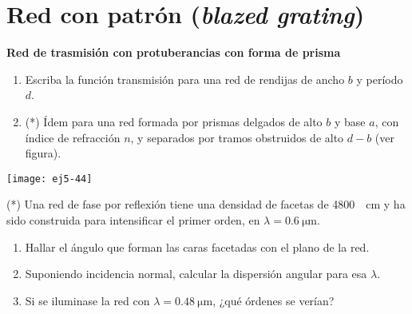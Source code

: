 \section*{Red con patrón (\emph{blazed grating})}

\item 
\begin{minipage}[t][2.5cm]{0.85\textwidth}
\textbf{Red de trasmisión con protuberancias con forma de prisma}
\begin{enumerate}
	\item Escriba la función transmisión para una red de rendijas de ancho $b$ y período $d$.
	\item (*) Ídem para una red formada por prismas delgados de alto $b$ y base $a$, con índice de refracción $n$, y separados por tramos obstruidos de alto $d-b$ (ver figura). 
\end{enumerate}
\end{minipage}
\begin{minipage}[c][1cm][t]{0.1\textwidth}
	\texttt{[image: ej5-44]}
\end{minipage}


\item (*) Una red de fase por reflexión tiene una densidad de facetas de \SI{4800}{\per\centi\metre} y ha sido construida para intensificar el primer orden, en $\lambda = \SI{0.6}{\micro\metre}$.
\begin{enumerate}
	\item Hallar el ángulo que forman las caras facetadas con el plano de la red. 
	\item Suponiendo incidencia normal, calcular la dispersión angular para esa $\lambda$. 
	\item Si se iluminase la red con $\lambda = \SI{0.48}{\micro\metre}$, ¿qué órdenes se verían?
\end{enumerate}




